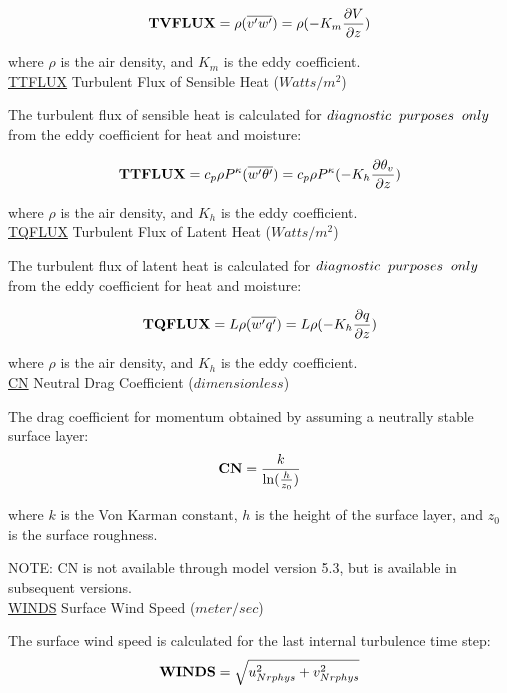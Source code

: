 \[
{\bf TVFLUX} =  {\rho } {(\overline{v^{\prime}w^{\prime}})} = 
 {\rho } {(- K_m \frac{\partial V}{\partial z})}
\]
 
\noindent
where $\rho$ is the air density, and $K_m$ is the eddy coefficient.
\\


\noindent
{ \underline {TTFLUX}  Turbulent Flux of Sensible Heat ($Watts/m^2$) }

\noindent
The turbulent flux of sensible heat is calculated for $diagnostic \hspace{.2cm} purposes 
\hspace{.2cm} only$ from the eddy coefficient for heat and moisture:

\noindent
\[
{\bf TTFLUX} = c_p {\rho }  
P^{\kappa}{(\overline{w^{\prime}\theta^{\prime}})}
 = c_p  {\rho } P^{\kappa}{(- K_h \frac{\partial \theta_v}{\partial z})}
\]
 
\noindent
where $\rho$ is the air density, and $K_h$ is the eddy coefficient.
\\


\noindent
{ \underline {TQFLUX}  Turbulent Flux of Latent Heat ($Watts/m^2$) }

\noindent
The turbulent flux of latent heat is calculated for $diagnostic \hspace{.2cm} purposes 
\hspace{.2cm} only$ from the eddy coefficient for heat and moisture:

\noindent
\[
{\bf TQFLUX} = {L {\rho } (\overline{w^{\prime}q^{\prime}})} = 
{L {\rho }(- K_h \frac{\partial q}{\partial z})}
\]
 
\noindent
where $\rho$ is the air density, and $K_h$ is the eddy coefficient.
\\

 
\noindent
{ \underline {CN}  Neutral Drag Coefficient ($dimensionless$) }

\noindent
The drag coefficient for momentum obtained by assuming a neutrally stable surface layer:
\[
{\bf CN} = \frac{ k }{ \ln(\frac{h }{z_0}) }
\]

\noindent
where $k$ is the Von Karman constant, $h$ is the height of the surface layer, and
$z_0$ is the surface roughness. 

\noindent
NOTE: CN is not available through model version 5.3, but is available in subsequent
versions.
\\

\noindent
{ \underline {WINDS}  Surface Wind Speed ($meter/sec$) }

\noindent
The surface wind speed is calculated for the last internal turbulence time step:
\[
{\bf WINDS} = \sqrt{u_{Nrphys}^2 + v_{Nrphys}^2}
\]

